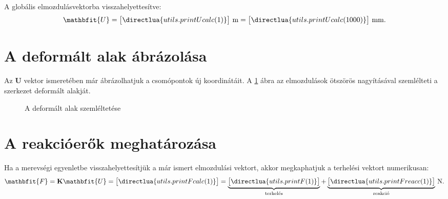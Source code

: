 \documentclass[a4paper, 12pt]{scrartcl}
\newcommand{\rvec}[1]{\mathbfit{#1}}
\newcommand{\rmat}[1]{\mathbf{#1}}
\begin{document}
A globális elmozdulásvektorba visszahelyettesítve:
\begin{equation}
  {\rvec U} = \begin{bmatrix}
    \directlua{utils.printUcalc(1)}
  \end{bmatrix} \, \mathrm{m}
  =
  \sisetup{
    exponent-mode = fixed,
    round-precision = 3
  }
  \begin{bmatrix}
    \directlua{utils.printUcalc(1000)}
  \end{bmatrix} \, \mathrm{mm}.
  \label{eq:Ucalc}
\end{equation}




\section{A deformált alak ábrázolása} %
\label{sec:A deformált alak ábrázolása}

Az $\rmat U$ vektor ismeretében már ábrázolhatjuk a csomópontok új koordinátáit.
A \ref{fig:deformed} ábra az elmozdulások ötszörös nagyításával szemlélteti a
szerkezet deformált alakját.

\begin{figure}[H]
  \centering
  
  \caption{A deformált alak szemléltetése}
  \label{fig:deformed}
\end{figure}




\section{A reakcióerők meghatározása} %
\label{sec:A reakcióerők meghatározása}

Ha a merevségi egyenletbe visszahelyettesítjük a már ismert elmozdulási vektort,
akkor megkaphatjuk a terhelési vektort numerikusan:
\begin{equation}
  \rvec F = \rmat K \rvec U =
  \sisetup{
    exponent-mode = fixed,
    round-precision = 3
  }
  \begin{bmatrix}
    \directlua{utils.printFcalc(1)}
  \end{bmatrix}
  =
  \underbrace{\begin{bmatrix}
      \directlua{utils.printF(1)}
    \end{bmatrix}}_\text{terhelés}
  +
  \underbrace{\begin{bmatrix}
      \directlua{utils.printFreacc(1)}
    \end{bmatrix}}_\text{reakció}
  \, \mathrm{N}.
  \label{eq:Fcalc}
\end{equation}
\end{document}
